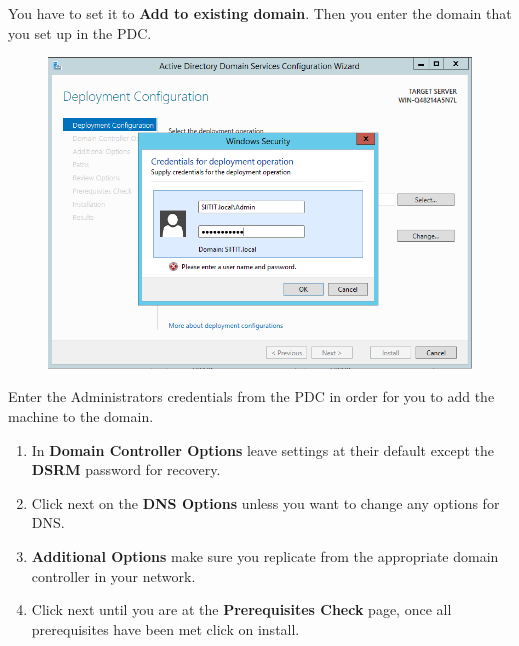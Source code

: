 \documentclass{article}
\begin{document}
You have to set it to \textbf{Add to existing domain}. Then you enter the domain that you set up in the PDC. 
\begin{figure}[h]
	\centering
	\includegraphics[width=.5\linewidth, height=.25\textheight]{BDC/2}
\end{figure}
\newline
Enter the Administrators credentials from the PDC in order for you to add the machine to the domain.
\begin{enumerate}
	\item In \textbf{Domain Controller Options} leave settings at their default except the \textbf{DSRM} password for recovery.
	\item Click next on the \textbf{DNS Options} unless you want to change any options for DNS.
	\item \textbf{Additional Options} make sure you replicate from the appropriate domain controller in your network.
	\item Click next until you are at the \textbf{Prerequisites Check} page, once all prerequisites have been met click on install.
\end{enumerate}
\end{document}
